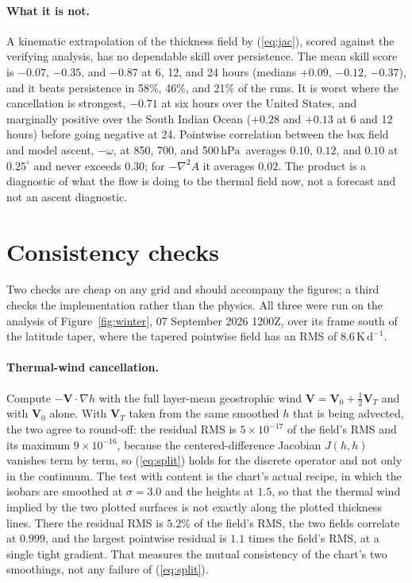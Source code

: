 \documentclass[11pt]{article}
\newcommand{\hPa}{\ensuremath{\,\mathrm{hPa}}}
\newcommand{\Kday}{\ensuremath{\,\mathrm{K\,d^{-1}}}}
\begin{document}
\paragraph{What it is not.} A kinematic extrapolation of the thickness field by (\ref{eq:jac}), scored against the verifying analysis, has no dependable skill over persistence. The mean skill score is $-0.07$, $-0.35$, and $-0.87$ at 6, 12, and 24 hours (medians $+0.09$, $-0.12$, $-0.37$), and it beats persistence in 58\%, 46\%, and 21\% of the runs. It is worst where the cancellation is strongest, $-0.71$ at six hours over the United States, and marginally positive over the South Indian Ocean ($+0.28$ and $+0.13$ at 6 and 12 hours) before going negative at 24. Pointwise correlation between the box field and model ascent, $-\omega$, at 850, 700, and 500\hPa\ averages $0.10$, $0.12$, and $0.10$ at $0.25^\circ$ and never exceeds $0.30$; for $-\nabla^2 A$ it averages $0.02$. The product is a diagnostic of what the flow is doing to the thermal field now, not a forecast and not an ascent diagnostic.

\section{Consistency checks}
\label{sec:checks}

Two checks are cheap on any grid and should accompany the figures; a third checks the implementation rather than the physics. All three were run on the analysis of Figure~\ref{fig:winter}, 07 September 2026 1200Z, over its frame south of the latitude taper, where the tapered pointwise field has an RMS of $8.6\Kday$.

\paragraph{Thermal-wind cancellation.} Compute $-\mathbf{V}\cdot\nabla h$ with the full layer-mean geostrophic wind $\mathbf{V} = \mathbf{V}_0 + \tfrac12\mathbf{V}_T$ and with $\mathbf{V}_0$ alone. With $\mathbf{V}_T$ taken from the same smoothed $h$ that is being advected, the two agree to round-off: the residual RMS is $5\times10^{-17}$ of the field's RMS and its maximum $9\times10^{-16}$, because the centered-difference Jacobian $J(h,h)$ vanishes term by term, so (\ref{eq:split}) holds for the discrete operator and not only in the continuum. The test with content is the chart's actual recipe, in which the isobars are smoothed at $\sigma = 3.0$ and the heights at $1.5$, so that the thermal wind implied by the two plotted surfaces is not exactly along the plotted thickness lines. There the residual RMS is $5.2\%$ of the field's RMS, the two fields correlate at $0.999$, and the largest pointwise residual is $1.1$ times the field's RMS, at a single tight gradient. That measures the mutual consistency of the chart's two smoothings, not any failure of (\ref{eq:split}).
\end{document}
